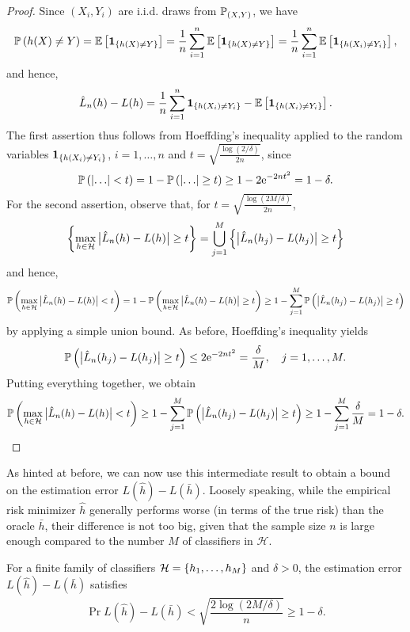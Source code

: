 \begin{proof}
Since $(X_i, Y_i)$ are i.i.d. draws from $\P_{(X, Y)}$, we have
\[
    \Pr{h(X) \neq Y} = \Ex{\indSet{h(X) \neq Y}} = \frac{1}{n} \sum_{i=1}^n \Ex{\indSet{h(X) \neq Y}} = \frac{1}{n} \sum_{i=1}^n \Ex{\indSet{h(X_i) \neq Y_i}},
\]
and hence,
\[
    \hat L_n(h) - L(h) = \frac{1}{n} \sum_{i=1}^n \indSet{h(X_i) \neq Y_i} - \Ex{\indSet{h(X_i) \neq Y_i}}.
\]
The first assertion thus follows from Hoeffding's inequality applied to the random variables $\indSet{h(X_i) \neq Y_i}$, $i = 1, \dots, n$ and $t = \sqrt{\frac{\log(2/\delta)}{2n}}$, since
\[
    \Pr{\abs{\ldots} < t} = 1 - \Pr{\abs{\ldots} \geq t} \geq 1 - 2\e^{-2nt^2} = 1 - \delta.
\]
For the second assertion, observe that, for $t = \sqrt{\frac{\log(2M/\delta)}{2n}}$,
\[
    \set{\max_{h \in \mathcal{H}} \bigAbs{ \hat L_n(h) - L(h) } \geq t} = \bigcup_{j=1}^M \set{\bigAbs{ \hat L_n(h_j) - L(h_j) } \geq t}
\]
and hence,
\[
    \Pr{\max_{h \in \mathcal{H}} \bigAbs{ \hat L_n(h) - L(h) } < t} = 1 - \Pr{\max_{h \in \mathcal{H}} \bigAbs{ \hat L_n(h) - L(h) } \geq t} \geq 1 - \sum_{j=1}^M \Pr{\bigAbs{ \hat L_n(h_j) - L(h_j) } \geq t}
\]
by applying a simple union bound. As before, Hoeffding's inequality yields
\[
    \Pr{\bigAbs{ \hat L_n(h_j) - L(h_j) } \geq t} \leq 2\e^{-2nt^2} = \frac{\delta}{M}, \quad j = 1, \dots, M.
\]
Putting everything together, we obtain
\[
    \Pr{\max_{h \in \mathcal{H}} \bigAbs{ \hat L_n(h) - L(h) } < t} \geq 1 - \sum_{j=1}^M \Pr{\bigAbs{ \hat L_n(h_j) - L(h_j) } \geq t} \geq 1 - \sum_{j=1}^M \frac{\delta}{M} = 1 - \delta.
\]
\end{proof}

As hinted at before, we can now use this intermediate result to obtain a bound on the estimation error $L(\hat h) - L(\bar h)$. Loosely speaking, while the empirical risk minimizer $\hat h$ generally performs worse (in terms of the true risk) than the oracle $\bar h$, their difference is not too big, given that the sample size $n$ is large enough compared to the number $M$ of classifiers in $\mathcal{H}$.

\begin{theorem}
\label{thm: estimation error finite dictionary}
For a finite family of classifiers $\mathcal{H} = \set{h_1, \dots, h_M}$ and $\delta > 0$, the estimation error $L(\hat h) - L(\bar h)$ satisfies
\[
    \Pr{L(\hat h) - L(\bar h) < \sqrt{\frac{2\log(2M/\delta)}{n}}} \geq 1 - \delta.
\]
\end{theorem}

